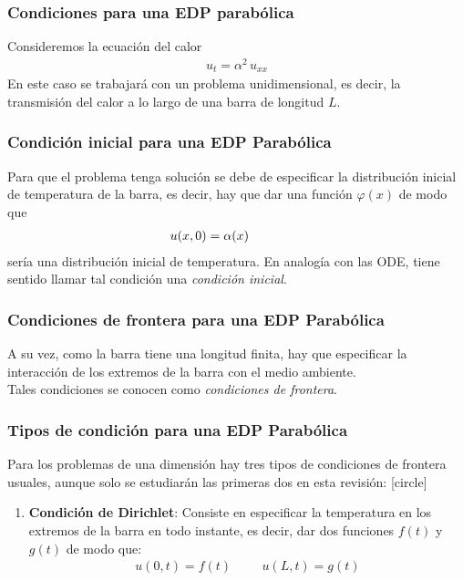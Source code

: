 \documentclass[12pt]{beamer}
\begin{document}
\begin{frame}
\frametitle{Condiciones para una EDP parabólica}
Consideremos la ecuación del calor
\begin{align*}
u_{t} =  \alpha^{2} \,  u_{xx}
\end{align*}
En este caso se trabajará con un problema unidimensional, es decir, la transmisión del calor a lo largo de una barra de longitud $L$.
\end{frame}
\begin{frame}
\frametitle{Condición inicial para una EDP Parabólica}
Para que el problema tenga solución se debe de especificar la distribución inicial de temperatura de la barra, es decir, hay que dar una función $\varphi (x)$ de modo que
\begin{align}
u(x, 0) = \alpha (x) \hspace{1.5cm} 
\label{eq:ecuacion_06_02_02}
\end{align}
sería una distribución inicial de temperatura. \pause En analogía con las ODE, tiene sentido llamar tal condición una \emph{condición inicial}.
\end{frame}
\begin{frame}
\frametitle{Condiciones de frontera para una EDP Parabólica}
A su vez, como la barra tiene una longitud finita, hay que especificar la interacción de los extremos de la barra con el medio ambiente.
\\
\bigskip
\pause
Tales condiciones se conocen como \emph{condiciones de frontera}.
\end{frame}
\begin{frame}
\frametitle{Tipos de condición para una EDP Parabólica}
Para los problemas de una dimensión hay tres tipos de condiciones de frontera usuales, aunque solo se estudiarán las primeras dos en esta revisión:
[circle]
\begin{enumerate}[<+->]
\item \textbf{Condición de Dirichlet}: Consiste en especificar la temperatura en los extremos de la barra en todo instante, es decir, dar dos funciones $f(t)$ y $g(t)$ de modo que:
\begin{align}
u(0, t) = f (t)  \hspace{1cm} u(L, t) = g(t)
\label{eq:ecuacion_06_02_03}    
\end{align}
\seti
\end{enumerate}
\end{frame}
\end{document}
